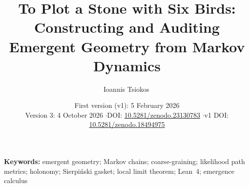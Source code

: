 \documentclass[11pt]{article}
\title{To Plot a Stone with Six Birds:\\Constructing and Auditing Emergent Geometry from Markov Dynamics}
\author{Ioannis Tsiokos\,\orcidlink{0009-0009-7659-5964}}
\date{First version (v1): 5 February 2026\\[2pt]
{\small Version 3: 4 October 2026 \quad$\cdot$\quad DOI: \href{https://doi.org/10.5281/zenodo.23130783}{10.5281/zenodo.23130783} \quad$\cdot$\quad v1 DOI: \href{https://doi.org/10.5281/zenodo.18494975}{10.5281/zenodo.18494975}}}
\begin{document}
\maketitle
\thispagestyle{firstpage}


\noindent\textbf{Keywords:} emergent geometry; Markov chains; coarse-graining; likelihood path metrics; holonomy; Sierpi\'nski gasket; local limit theorem; Lean~4; emergence calculus












\clearpage



\appendix




\end{document}

